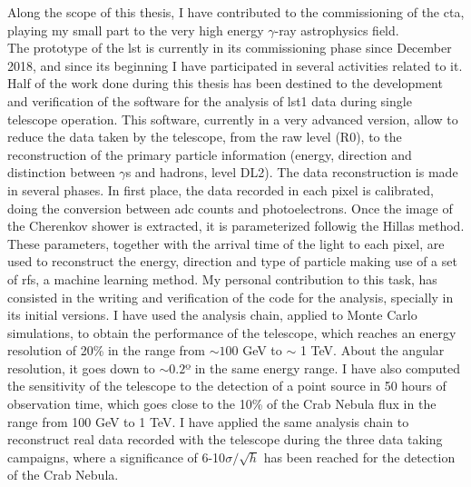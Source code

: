 \documentclass[main.tex]{subfiles}
\begin{document}
\glsresetall

Along the scope of this thesis, I have contributed to the commissioning of the \gls{cta}, playing my small part to the very high energy $\gamma$-ray astrophysics field.\\
The prototype of the \gls{lst} is currently in its commissioning phase since December 2018, and since its beginning I have participated in several activities related to it. Half of the work done during this thesis has been destined to the development and verification of the software for the analysis of \gls{lst}1 data during single telescope operation. This software, currently in a very advanced version, allow to reduce the data taken by the telescope, from the raw level (R0), to the reconstruction of the primary particle information (energy, direction and distinction between $\gamma$s and hadrons, level DL2). The data reconstruction is made in several phases. In first place, the data recorded in each pixel is calibrated, doing the conversion between \gls{adc} counts and photoelectrons. Once the image of the Cherenkov shower is extracted, it is parameterized followig the Hillas method. These parameters, together with the arrival time of the light to each pixel, are used to reconstruct the energy, direction and type of particle making use of a set of \glspl{rf}, a machine learning method. My personal contribution to this task, has consisted in the writing and verification of the code for the analysis, specially in its initial versions. I have used the analysis chain, applied to Monte Carlo simulations, to obtain the performance of the telescope, which reaches an energy resolution of 20\% in the range from $\sim 100$ GeV to $\sim$ 1 TeV. About the angular resolution, it goes down to $\sim 0.2$º in the same energy range. I have also computed the sensitivity of the telescope to the detection of a point source in 50 hours of observation time, which goes close to the 10\% of the Crab Nebula flux in the range from 100 GeV to 1 TeV. I have applied the same analysis chain to reconstruct real data recorded with the telescope during the three data taking campaigns, where a significance of 6-10$\sigma/\sqrt{h}$ has been reached for the detection of the Crab Nebula.\\
\end{document}
